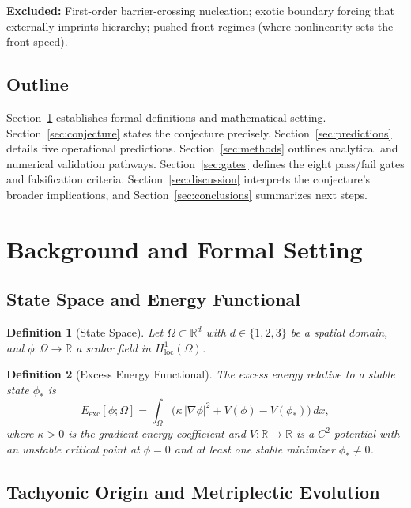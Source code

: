 \documentclass{article}
\newtheorem{definition}{Definition}
\begin{document}
\textbf{Excluded:} First-order barrier-crossing nucleation; exotic boundary forcing that externally imprints hierarchy; pushed-front regimes (where nonlinearity sets the front speed).

\subsection{Outline}

Section~\ref{sec:background} establishes formal definitions and mathematical setting. Section~\ref{sec:conjecture} states the conjecture precisely. Section~\ref{sec:predictions} details five operational predictions. Section~\ref{sec:methods} outlines analytical and numerical validation pathways. Section~\ref{sec:gates} defines the eight pass/fail gates and falsification criteria. Section~\ref{sec:discussion} interprets the conjecture's broader implications, and Section~\ref{sec:conclusions} summarizes next steps.

\section{Background and Formal Setting}
\label{sec:background}

\subsection{State Space and Energy Functional}

\begin{definition}[State Space]
Let $\Omega\subset\mathbb{R}^d$ with $d\in\{1,2,3\}$ be a spatial domain, and $\phi:\Omega\to\mathbb{R}$ a scalar field in $H^1_{\text{loc}}(\Omega)$.
\end{definition}

\begin{definition}[Excess Energy Functional]
The excess energy relative to a stable state $\phi_\ast$ is
\begin{equation}
E_{\text{exc}}[\phi;\Omega] = \int_{\Omega}\Big(\kappa\,|\nabla \phi|^2 + V(\phi)-V(\phi_\ast)\Big)\,dx,
\end{equation}
where $\kappa>0$ is the gradient-energy coefficient and $V:\mathbb{R}\to\mathbb{R}$ is a $C^2$ potential with an unstable critical point at $\phi=0$ and at least one stable minimizer $\phi_\ast\neq 0$.
\end{definition}

\subsection{Tachyonic Origin and Metriplectic Evolution}
\end{document}
